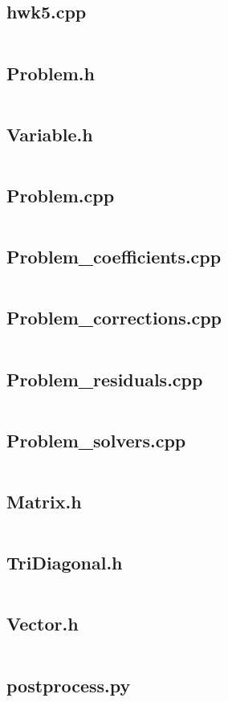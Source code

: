 \documentclass{article}
\begin{document}
\subsection*{hwk5.cpp}
\inputminted[fontsize=\scriptsize]{c++}{../final.cpp}

\newpage
\subsection*{Problem.h}
\inputminted[fontsize=\scriptsize]{c++}{../Problem.h}

\newpage
\subsection*{Variable.h}
\inputminted[fontsize=\scriptsize]{c++}{../Variable.h}

\newpage
\subsection*{Problem.cpp}
\inputminted[fontsize=\scriptsize]{c++}{../Problem.cpp}

\newpage
\subsection*{Problem\_coefficients.cpp}
\inputminted[fontsize=\scriptsize]{c++}{../Problem_coefficients.cpp}

\newpage
\subsection*{Problem\_corrections.cpp}
\inputminted[fontsize=\scriptsize]{c++}{../Problem_corrections.cpp}

\newpage
\subsection*{Problem\_residuals.cpp}
\inputminted[fontsize=\scriptsize]{c++}{../Problem_residuals.cpp}

\newpage
\subsection*{Problem\_solvers.cpp}
\inputminted[fontsize=\scriptsize]{c++}{../Problem_solvers.cpp}

\newpage
\subsection*{Matrix.h}
\inputminted[fontsize=\scriptsize]{c++}{../Matrix.h}

\newpage
\subsection*{TriDiagonal.h}
\inputminted[fontsize=\scriptsize]{c++}{../TriDiagonal.h}

\newpage
\subsection*{Vector.h}
\inputminted[fontsize=\scriptsize]{c++}{../Vector.h}

\newpage
\subsection*{postprocess.py}
\inputminted[fontsize=\scriptsize]{python}{../postprocess.py}
\end{document}
